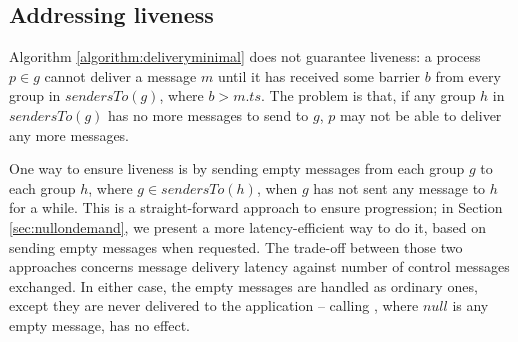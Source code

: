 \documentclass[times, 10pt]{article}
\begin{document}
%   
%   
% 
% 





\subsection{Addressing liveness}
\label{sec:liveness}

Algorithm \ref{algorithm:deliveryminimal} does not guarantee liveness: a process $p \in g$ cannot deliver a message $m$ until it has received some barrier $b$ from every group in $sendersTo(g)$, where $b > m.ts$. The problem is that, if any group $h$ in $sendersTo(g)$ has no more messages to send to $g$, $p$ may not be able to deliver any more messages.

One way to ensure liveness is by sending empty messages from each group $g$ to each group $h$, where $g \in sendersTo(h)$, when $g$ has not sent any message to $h$ for a while. This is a straight-forward approach to ensure progression; in Section \ref{sec:nullondemand}, we present a more latency-efficient way to do it, based on sending empty messages when requested. The trade-off between those two approaches concerns message delivery latency against number of control messages exchanged. In either case, the empty messages are handled as ordinary ones, except they are never delivered to the application -- calling , where $null$ is any empty message, has no effect.
\end{document}
